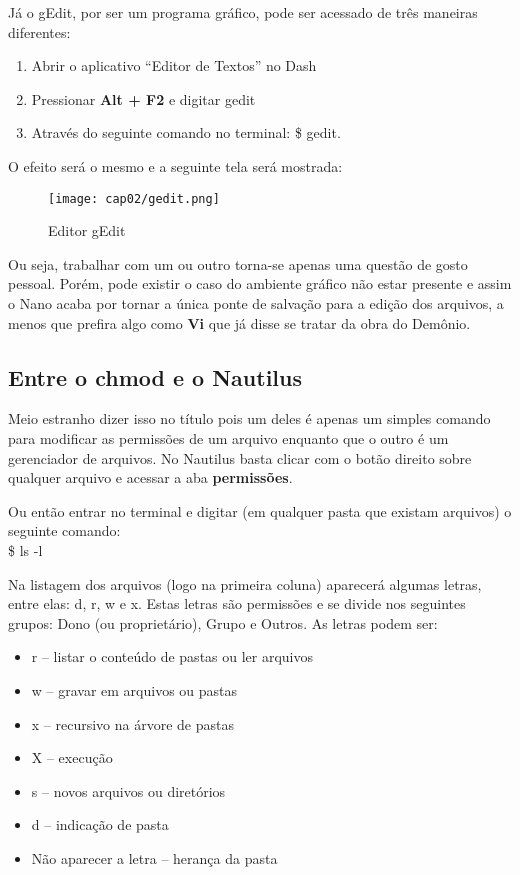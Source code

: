 Já o gEdit, por ser um programa gráfico, pode ser acessado de três maneiras diferentes: \vspace{-1em}
\begin{enumerate}[noitemsep]
 \item Abrir o aplicativo ``Editor de Textos'' no Dash
 \item Pressionar \textbf{Alt + F2} e digitar {\ttfamily gedit}
 \item Através do seguinte comando no terminal: {\ttfamily\$ gedit}.
\end{enumerate}

O efeito será o mesmo e a seguinte tela será mostrada:
\begin{figure}[H]
 \centering\texttt{[image: cap02/gedit.png]}
 \caption{Editor gEdit}
\end{figure}

Ou seja, trabalhar com um ou outro torna-se apenas uma questão de gosto pessoal. Porém, pode existir o caso do ambiente gráfico não estar presente e assim o Nano acaba por tornar a única ponte de salvação para a edição dos arquivos, a menos que prefira algo como \textbf{Vi} que já disse se tratar da obra do Demônio.

\subsection{Entre o chmod e o Nautilus}
Meio estranho dizer isso no título pois um deles é apenas um simples comando para modificar as permissões de um arquivo enquanto que o outro é um gerenciador de arquivos. No Nautilus basta clicar com o botão direito sobre qualquer arquivo e acessar a aba \textbf{permissões}. 

Ou então entrar no terminal e digitar (em qualquer pasta que existam arquivos) o seguinte comando: \\
{\ttfamily\$ ls -l}

Na listagem dos arquivos (logo na primeira coluna) aparecerá algumas letras, entre elas: d, r, w e x. Estas letras são permissões e se divide nos seguintes grupos: Dono (ou proprietário), Grupo e Outros. As letras podem ser: \vspace{-1em}
\begin{itemize}[noitemsep]
 \item r – listar o conteúdo de pastas ou ler arquivos
 \item w – gravar em arquivos ou  pastas
 \item x – recursivo na árvore de pastas
 \item X – execução
 \item s – novos arquivos ou diretórios
 \item d – indicação de pasta
 \item Não aparecer a letra – herança da pasta
\end{itemize}

